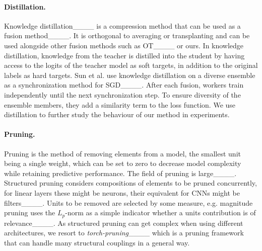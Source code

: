 

\paragraph{Distillation.}
Knowledge distillation____ is a compression method that can be used as a fusion method____. It is orthogonal to averaging or transplanting and can be used alongside other fusion methods such as OT____ or ours. In knowledge distillation, knowledge from the teacher is distilled into the student by having access to the logits of the teacher model as soft targets, in addition to the original labels as hard targets. Sun et al. use knowledge distillation on a diverse ensemble as a synchronization method for SGD____. After each fusion, workers train independently until the next synchronization step. To ensure diversity of the ensemble members, they add a similarity term to the loss function. We use distillation to further study the behaviour of our method in experiments.

\paragraph{Pruning.}
Pruning is the method of removing elements from a model, the smallest unit being a single weight, which can be set to zero to decrease model complexity while retaining predictive performance. The field of pruning is large____. Structured pruning considers compositions of elements to be pruned concurrently, for linear layers these might be neurons, their equivalent for CNNs might be filters____. Units to be removed are selected by some measure, e.g. magnitude pruning uses the $L_p$-norm as a simple indicator whether a units contribution is of relevance____. As structured pruning can get complex when using different architectures, we resort to \emph{torch-pruning}____ which is a pruning framework that can handle many structural couplings in a general way.



